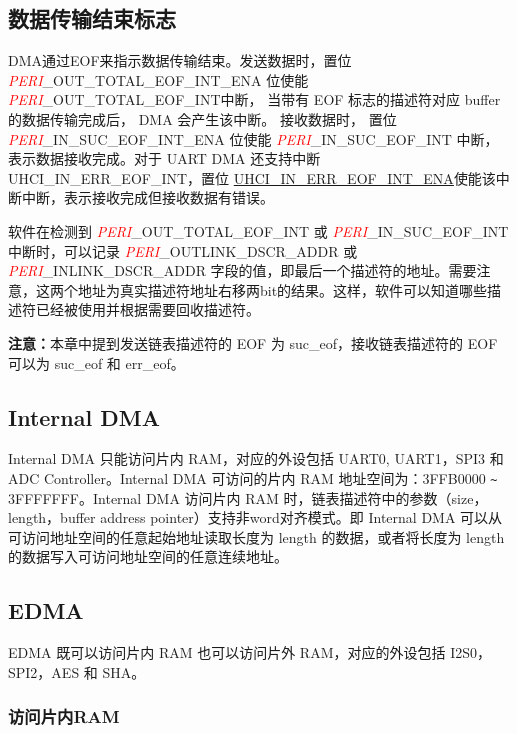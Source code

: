 \documentclass[main\_\_CN.tex]{subfiles}
\begin{document}
\subsection{数据传输结束标志}

DMA通过EOF来指示数据传输结束。发送数据时，置位 \textcolor{red}{\it{PERI}}\_OUT\_TOTAL\_EOF\_INT\_ENA 位使能\\ \textcolor{red}{\it{PERI}}\_OUT\_TOTAL\_EOF\_INT中断， 当带有 EOF 标志的描述符对应 buffer 的数据传输完成后， DMA 会产生该中断。 接收数据时， 置位 \textcolor{red}{\it{PERI}}\_IN\_SUC\_EOF\_INT\_ENA 位使能 \textcolor{red}{\it{PERI}}\_IN\_SUC\_EOF\_INT 中断，表示数据接收完成。对于 UART DMA 还支持中断 UHCI\_IN\_ERR\_EOF\_INT，置位 \hyperref[fielddesc:UHCIINERREOFINTENA]{UHCI\_IN\_ERR\_EOF\_INT\_ENA}使能该中断中断，表示接收完成但接收数据有错误。

软件在检测到 \textcolor{red}{\it{PERI}}\_OUT\_TOTAL\_EOF\_INT 或 \textcolor{red}{\it{PERI}}\_IN\_SUC\_EOF\_INT 中断时，可以记录 \textcolor{red}{\it{PERI}}\_OUTLINK\_DSCR\_ADDR 或 \textcolor{red}{\it{PERI}}\_INLINK\_DSCR\_ADDR 字段的值，即最后一个描述符的地址。需要注意，这两个地址为真实描述符地址右移两bit的结果。这样，软件可以知道哪些描述符已经被使用并根据需要回收描述符。

{\bfseries 注意：}本章中提到发送链表描述符的 EOF 为 suc\_eof，接收链表描述符的 EOF 可以为 suc\_eof 和 err\_eof。

\subsection{Internal DMA} \label{internal DMA}
Internal DMA 只能访问片内 RAM，对应的外设包括 UART0, UART1，SPI3 和 ADC Controller。Internal DMA 可访问的片内 RAM 地址空间为：\hexprefix{}3FFB0000 \verb+~+ \hexprefix{}3FFFFFFF。Internal DMA 访问片内 RAM 时，链表描述符中的参数（size，length，buffer address pointer）支持非word对齐模式。即 Internal DMA 可以从可访问地址空间的任意起始地址读取长度为 length 的数据，或者将长度为 length 的数据写入可访问地址空间的任意连续地址。

\subsection{EDMA} \label{edma}
EDMA 既可以访问片内 RAM 也可以访问片外 RAM，对应的外设包括 I2S0，SPI2，AES 和 SHA。

\subsubsection{访问片内RAM}
\end{document}
